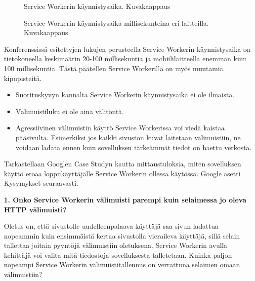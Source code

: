 \documentclass{tktltiki}
\begin{document}
\begin{figure}[h]
\begin{center}
\caption{Service Workerin käynnistysaika. Kuvakaappaus \cite{GoogleDevSummit}}
\label{SW bootup time}
\end{center}
\end{figure}

\begin{figure}[h]
\begin{center}
\caption{Service Workerin käynnistysaika millisekunteina eri laitteilla. Kuvakaappaus \cite{GoogleDevSummit}}
\label{SW bootup time on device}
\end{center}
\end{figure}

\clearpage

Konferenssissä esitettyjen lukujen perusteella Service Workerin käynnistysaika on tietokoneella keskimäärin 20-100 millisekuntia ja mobiililaitteella enemmän kuin 100 millisekuntia. Tästä päätellen Service Workerilla on myös muutamia kipupisteitä.

\begin{itemize}
  \item Suorituskyvyn kannalta Service Workerin käynnistysaika ei ole ilmaista. 
  \item Välimuistiluku ei ole aina välitöntä.
  \item Agressiivinen välimuistin käyttö Service Workerissa voi viedä kaistaa pääsivulta. Esimerkiksi jos kaikki sivuston kuvat laitetaan välimuistiin, ne voidaan ladata ennen kuin sovelluksen tärkeämmät tiedot on haettu verkosta.
\end{itemize}

Tarkastellaan Googlen Case Studyn kautta mittaustuloksia, miten sovelluksen käyttö eroaa loppukäyttäjälle Service Workerin ollessa käytössä. Google asetti Kysymykset seuraavasti.

\textbf{1. Onko Service Workerin välimuisti parempi kuin selaimessa jo oleva HTTP välimuisti?}

Oletus on, että sivustolle uudelleenpalaava käyttäjä saa sivun ladattua nopeammin kuin ensimmäistä kertaa sivustolla vieraileva käyttäjä, sillä selain tallettaa joitain pyyntöjä välimuistiin oletuksena. Service Workerin avulla kehittäjä voi valita mitä tiedostoja sovelluksesta talletetaan. Kuinka paljon nopeampi Service Workerin välimuistitallennus on verrattuna selaimen omaan välimuistiin?
\end{document}
